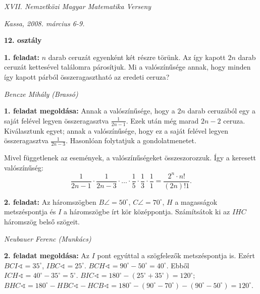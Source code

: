 \documentclass[a4paper,10pt]{article}
\def\ki#1#2{\hfill {\it #1 (#2)}\medskip}
\begin{document}
\begin{center} \Large {\em XVII. Nemzetközi Magyar Matematika Verseny} \end{center}
\begin{center} \large{\em Kassa, 2008. március 6-9.} \end{center}
\smallskip
\begin{center} \large{\bf 12. osztály} \end{center}
\bigskip 

{\bf 1. feladat: } $n$ darab ceruzát egyenként két részre törünk. Az így kapott $2n$ darab ceruzát kettesével találomra párosítjuk. Mi a valószínűsége annak, hogy minden így kapott párból összeragasztható az eredeti ceruza?

\ki{Bencze Mihály}{Brassó}\medskip

{\bf 1. feladat megoldása: } Annak a valószínűsége, hogy a $2n$ darab ceruzából egy a saját felével
legyen összeragasztva $\frac{1}{2n-1}$. Ezek után még marad $2n-2$ ceruza. Kiválasztunk egyet; annak a valószínűsége, hogy ez a saját felével legyen összeragasztva $\frac{1}{2n-3}$.
Hasonlóan folytatjuk a gondolatmenetet.

Mivel függetlenek az események, a valószínűségeket összeszorozzuk. Így a keresett valószínűség:
$$\frac{1}{2n-1}\cdot\frac{1}{2n-3}\cdot\dots \cdot\frac{1}{5}\cdot\frac{1}{3}\cdot\frac{1}{1}
=\frac{2^n\cdot n!}{\left(2n\right)!1}.$$

\medskip
{\bf 2. feladat: } Az  háromszögben $B\angle=50^\circ$, $C\angle=70^\circ$, $H$ a magasságok metszéspontja és $I$ a háromszögbe írt kör középpontja. Számítsátok ki az $IHC$ háromszög belső szögeit.

\ki{Neubauer Ferenc}{Munkács}\medskip

{\bf 2. feladat megoldása: } Az $I$ pont egyúttal a szögfelezők metszéspontja is.
Ezért $BCI\sphericalangle=35^\circ$, $IBC\sphericalangle=25^\circ$.
$BCH\sphericalangle=90^\circ-50^\circ=40^\circ$. Ebből $ICH\sphericalangle=40^\circ-35^\circ=5^\circ$.
$BIC\sphericalangle=180^\circ-(25^\circ+35^\circ)=120^\circ$;
$BHC\sphericalangle=180^\circ-HBC\sphericalangle-HCB\sphericalangle
=180^\circ-(90^\circ-70^\circ)-(90^\circ-50^\circ)=120^\circ$.
\end{document}
